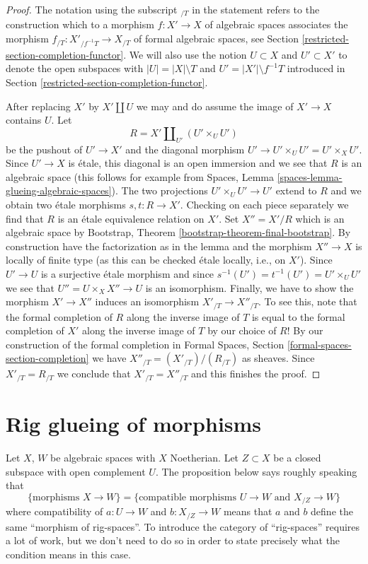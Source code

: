 \begin{proof}
The notation using the subscript ${}_{/T}$ in the statement refers to the
construction which to a morphism $f : X' \to X$ of algebraic spaces
associates the morphism $f_{/T} : X'_{/f^{-1}T} \to X_{/T}$ of formal
algebraic spaces, see Section \ref{restricted-section-completion-functor}.
We will also use the notion $U \subset X$ and $U' \subset X'$ to denote
the open subspaces with $|U| = |X| \setminus T$ and
$U' = |X'| \setminus f^{-1}T$ introduced in
Section \ref{restricted-section-completion-functor}.

\medskip\noindent
After replacing $X'$ by $X' \amalg U$ we may and do assume
the image of $X' \to X$ contains $U$.
Let
$$
R = X' \amalg_{U'} (U' \times_U U')
$$
be the pushout of $U' \to X'$ and the diagonal morphism
$U' \to U' \times_U U' = U' \times_X U'$. Since $U' \to X$ is \'etale,
this diagonal is an open immersion and we see that $R$ is an algebraic space
(this follows for example from
Spaces, Lemma \ref{spaces-lemma-glueing-algebraic-spaces}).
The two projections $U' \times_U U' \to U'$ extend to $R$
and we obtain two \'etale morphisms $s, t : R \to X'$.
Checking on each piece separately we find that $R$
is an \'etale equivalence relation on $X'$. Set $X'' = X'/R$
which is an algebraic space by
Bootstrap, Theorem \ref{bootstrap-theorem-final-bootstrap}.
By construction have the factorization as in the lemma and
the morphism $X'' \to X$ is locally of finite type (as this
can be checked \'etale locally, i.e., on $X'$).
Since $U' \to U$ is a surjective \'etale morphism
and since $s^{-1}(U') = t^{-1}(U') = U' \times_U U'$
we see that $U'' = U \times_X X'' \to U$ is an isomorphism.
Finally, we have to show the morphism $X' \to X''$ induces an isomorphism
$X'_{/T} \to X''_{/T}$. To see this, note that the formal completion of $R$
along the inverse image of $T$ is equal to the formal completion of
$X'$ along the inverse image of $T$ by our choice of $R$! By
our construction of the formal completion in
Formal Spaces, Section \ref{formal-spaces-section-completion}
we have $X''_{/T} = (X'_{/T}) / (R_{/T})$ as sheaves. Since
$X'_{/T} = R_{/T}$ we conclude that $X'_{/T} = X''_{/T}$
and this finishes the proof.
\end{proof}

\section{Rig glueing of morphisms}
\label{restricted-section-glue-formal-to-actual}
Let $X$, $W$ be algebraic spaces with $X$ Noetherian. Let $Z \subset X$
be a closed subspace with open complement $U$.
The proposition below says roughly speaking that
$$
\{\text{morphisms }X \to W\} =
\{\text{compatible morphisms }U \to W\text{ and }X_{/Z} \to W\}
$$
where compatibility of $a : U \to W$ and $b : X_{/Z} \to W$
means that $a$ and $b$ define the same ``morphism of rig-spaces''.
To introduce the category of ``rig-spaces'' requires a lot of work, but
we don't need to do so in order to state precisely what the
condition means in this case.


